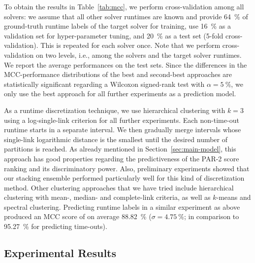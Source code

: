 \documentclass[runningheads]{llncs}
\begin{document}

To obtain the results in Table~\ref{tab:mcc}, we perform cross-validation among all solvers: we assume that all other solver runtimes are known and provide \SI{64}{\%} of ground-truth runtime labels of the target solver for training, use \SI{16}{\%} as a validation set for hyper-parameter tuning, and \SI{20}{\%} as a test set (5-fold cross-validation).
This is repeated for each solver once.
Note that we perform cross-validation on two levels, i.e., among the solvers and the target solver runtimes.
We report the average performances on the test sets.
Since the differences in the MCC-performance distributions of the best and second-best approaches are statistically significant regarding a Wilcoxon signed-rank test with $\alpha = \SI{5}{\%}$, we only use the best approach for all further experiments as a prediction model.

As a runtime discretization technique, we use hierarchical clustering with $k = 3$ using a log-single-link criterion for all further experiments.
Each non-time-out runtime starts in a separate interval.
We then gradually merge intervals whose single-link logarithmic distance is the smallest until the desired number of partitions is reached.
As already mentioned in Section~\ref{sec:main-model}, this approach has good properties regarding the predictiveness of the PAR-2 score ranking and its discriminatory power.
Also, preliminary experiments showed that our stacking ensemble performed particularly well for this kind of discretization method.
Other clustering approaches that we have tried include hierarchical clustering with mean-, median- and complete-link criteria, as well as $k$-means and spectral clustering.
Predicting runtime labels in a similar experiment as above produced an MCC score of on average \SI{88.82}{\%} ($\sigma = \SI{4.75}{\%}$; in comparison to \SI{95.27}{\%} for predicting time-outs).

\subsection{Experimental Results}
\end{document}
